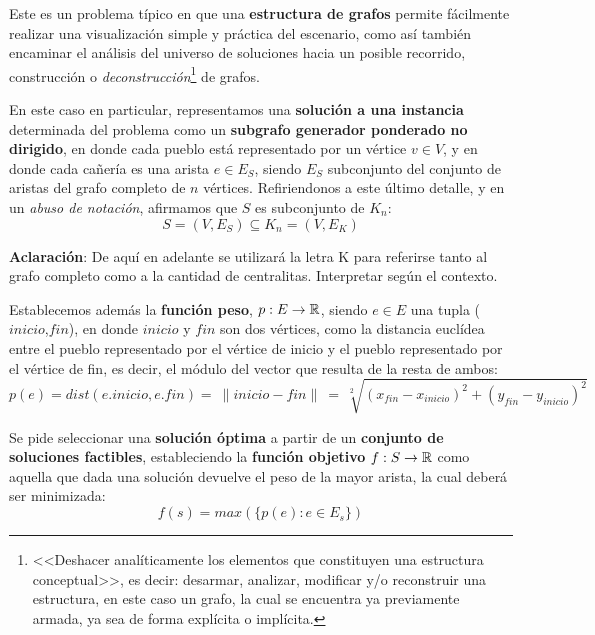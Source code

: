 \documentclass[11pt, a4paper, twoside]{article}
\begin{document}
{}


Este es un problema típico en que una \textbf{estructura de grafos} permite fácilmente realizar una visualización simple y práctica del escenario, como así también encaminar el análisis del universo de soluciones hacia un posible recorrido, construcción o \emph{deconstrucción}\footnote{<<Deshacer analíticamente los elementos que constituyen una estructura conceptual>>, es decir: desarmar, analizar, modificar y/o reconstruir una estructura, en este caso un grafo, la cual se encuentra ya previamente armada, ya sea de forma explícita o implícita.} de grafos.

En este caso en particular, representamos una \textbf{solución a una instancia} determinada del
problema como un \textbf{subgrafo generador ponderado no dirigido}, en donde cada pueblo está
representado por un vértice $v \in V$, y en donde cada cañería es una arista $e \in E_{S}$, siendo
$E_{S}$ subconjunto del conjunto de aristas del grafo completo de $n$ vértices. Refiriendonos a este
último detalle, y en un \emph{abuso de notación}, afirmamos que $S$ es subconjunto de $K_{n}$:
%
    \[
    S = (V,E_{S}) \subseteq K_{n} = (V,E_{K})
    \]
%

\textbf{Aclaración}: De aquí en adelante se utilizará la letra K para referirse tanto al grafo
completo como a la cantidad de centralitas. Interpretar según el contexto.


Establecemos además la \textbf{función peso}, $p: E \rightarrow \mathbb{R}$, siendo $e \in E$ una tupla
($inicio$,$fin$), en donde $inicio$ y $fin$ son dos vértices, como la distancia euclídea entre el
pueblo representado por el vértice de inicio y el pueblo representado por el vértice de fin, es
decir, el módulo del vector que resulta de la resta de ambos:
%
\[
  p(e) = dist(e.inicio, e.fin) =~\parallel inicio - fin \parallel ~=~ \sqrt[2]{(x_{fin}-x_{inicio})^{2}+(y_{fin}-y_{inicio})^{2}}
\]


Se pide seleccionar una \textbf{solución óptima} a partir de un \textbf{conjunto de soluciones
factibles}, estableciendo la \textbf{función objetivo} $f: S \rightarrow \mathbb{R}$ como aquella que
dada una solución devuelve el peso de la mayor arista, la cual deberá ser minimizada:
%
\[
f(s) = max(\{p(e) : e \in E_{s}\})
\]
\end{document}
